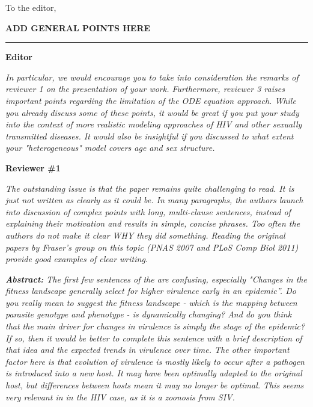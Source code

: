 \documentclass[10pt]{letter}
\newcommand{\revcomment}[1]{\emph{#1}}
\newcommand{\response}[1]{#1}
\newcommand{\todo}[1]{{\color{red} \bf #1}}
\begin{document}
\date{\today}

\signature{\texttt{[image: bbsig3.png]}\\Benjamin Bolker}

\begin{letter}{
} 

\opening{To the editor,}

\todo{ADD GENERAL POINTS HERE}

\vskip10pt
\hrule

\textbf{Editor}

\revcomment{
In particular, we would encourage you to take into consideration the remarks of reviewer 1 on the presentation of your work. Furthermore, reviewer 3 raises important points regarding the limitation of the ODE equation approach. While you already discuss some of these points, it would be great if you put your study into the context of more realistic modeling approaches of HIV and other sexually transmitted diseases. It would also be insightful if you discussed to what extent your "heterogeneous" model covers age and sex structure.
}

\textbf{Reviewer \#1}

\revcomment{
The outstanding issue is that the paper remains quite challenging to
read. It is just not written as clearly as it could be. In many
paragraphs, the authors launch into discussion of complex points with
long, multi-clause sentences, instead of explaining their motivation
and results in simple, concise phrases. Too often the authors do not
make it clear WHY they did something. Reading the original papers by
Fraser’s group on this topic (PNAS 2007 and PLoS Comp Biol 2011)
provide good examples of clear writing.
}

\revcomment{
\textbf{Abstract:} The first few sentences of the are confusing,
especially "Changes in the fitness landscape generally select for
higher virulence early in an epidemic”. Do you really mean to suggest
the fitness landscape - which is the mapping between parasite genotype
and phenotype - is dynamically changing? And do you think that the
main driver for changes in virulence is simply the stage of the
epidemic? If so, then it would be better to complete this sentence
with a brief description of that idea and the expected trends in
virulence over time. The other important factor here is that evolution
of virulence is mostly likely to occur after a pathogen is introduced
into a new host. It may have been optimally adapted to the original
host, but differences between hosts mean it may no longer be
optimal. This seems very relevant in in the HIV case, as it is a
zoonosis from SIV.
}


\end{letter}
\end{document}

